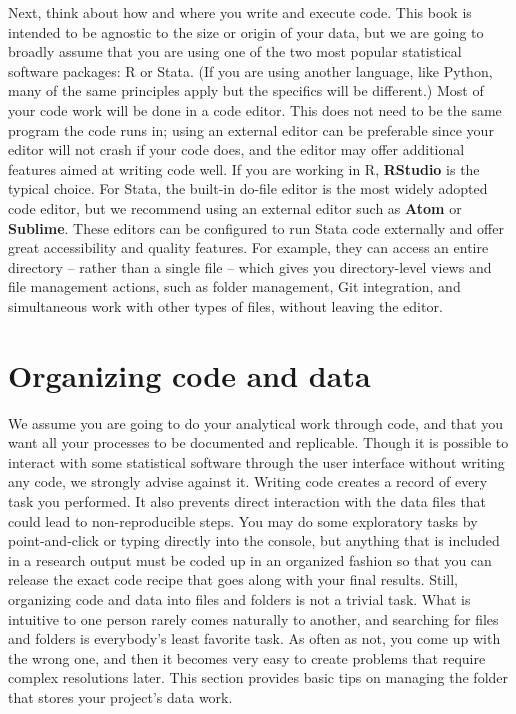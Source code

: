 Next, think about how and where you write and execute code.
This book is intended to be agnostic to the size or origin of your data,
but we are going to broadly assume that you are using
one of the two most popular statistical software packages: R or Stata.
(If you are using another language, like Python,
many of the same principles apply but the specifics will be different.)
Most of your code work will be done in a code editor.
This does not need to be the same program the code runs in;
using an external editor can be preferable since your editor will not crash if your code does,
and the editor may offer additional features aimed at writing code well.
If you are working in R, \textbf{RStudio} is the typical choice.
For Stata, the built-in do-file editor is the most widely adopted code editor,
but we recommend using an external editor such as
\textbf{Atom} or
\textbf{Sublime}.
These editors can be configured to run Stata code externally
and offer great accessibility and quality features.
For example, they can access an entire directory -- rather than a single file --
which gives you directory-level views and file management actions,
such as folder management, Git integration,
and simultaneous work with other types of files, without leaving the editor.

\section{Organizing code and data}

We assume you are going to do your analytical work through code,
and that you want all your processes to be documented and replicable.
Though it is possible to interact with some statistical software
through the user interface without writing any code,
we strongly advise against it.
Writing code creates a record of every task you performed.
It also prevents direct interaction with the data files that could lead to non-reproducible steps.
You may do some exploratory tasks by point-and-click or typing directly into the console,
but anything that is included in a research output
must be coded up in an organized fashion so that you can release
the exact code recipe that goes along with your final results.
Still, organizing code and data into files and folders is not a trivial task.
What is intuitive to one person rarely comes naturally to another,
and searching for files and folders is everybody's least favorite task.
As often as not, you come up with the wrong one,
and then it becomes very easy to create problems that require complex resolutions later.
This section provides basic tips on managing the folder
that stores your project's data work.

